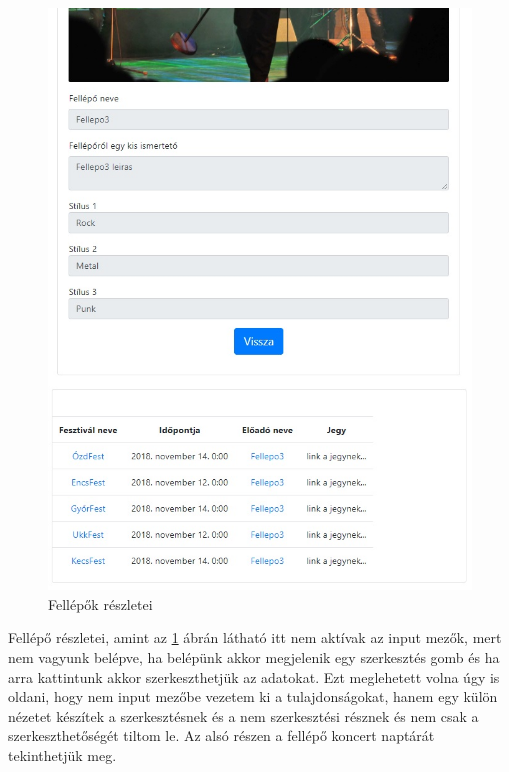 \begin{figure}
\centering
\includegraphics[scale=0.8]{kepek/artistDet.jpg}
\caption{Fellépők részletei}
\label{fig:artistDet}
\end{figure}

Fellépő részletei, amint az \ref{fig:artistDet} ábrán látható itt nem aktívak az input mezők, mert nem vagyunk belépve, ha belépünk akkor megjelenik egy szerkesztés gomb és ha arra kattintunk akkor szerkeszthetjük az adatokat. Ezt meglehetett volna úgy is oldani, hogy nem input mezőbe vezetem ki a tulajdonságokat, hanem egy külön nézetet készítek a szerkesztésnek és a nem szerkesztési résznek és nem csak a szerkeszthetőségét tiltom le. Az alsó részen a fellépő koncert naptárát tekinthetjük meg.

